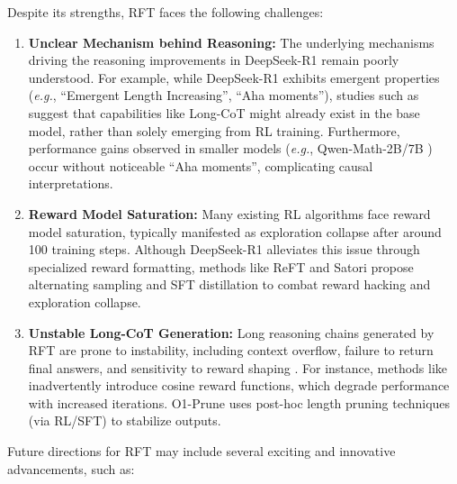 Despite its strengths, RFT faces the following challenges:

\begin{enumerate}[itemindent=0em]

\item \textbf{Unclear Mechanism behind Reasoning:} The underlying mechanisms driving the reasoning improvements in DeepSeek-R1 remain poorly understood. 
For example, while DeepSeek-R1 exhibits emergent properties (\emph{e.g.}, ``Emergent Length Increasing'', ``Aha moments''), studies such as \cite{ThereMaybeNot} suggest that capabilities like Long-CoT might already exist in the base model, rather than solely emerging from RL training. 
Furthermore, performance gains observed in smaller models (\emph{e.g.}, Qwen-Math-2B/7B \cite{qwen2}) occur without noticeable ``Aha moments'', complicating causal interpretations.

\item \textbf{Reward Model Saturation:} Many existing RL algorithms face reward model saturation, typically manifested as exploration collapse after around 100 training steps. 
Although DeepSeek-R1 alleviates this issue through specialized reward formatting, methods like ReFT \cite{trung2024reft} and Satori \cite{Satori} propose alternating sampling and SFT distillation to combat reward hacking and exploration collapse.

\item \textbf{Unstable Long-CoT Generation:} Long reasoning chains generated by RFT are prone to instability, including context overflow, failure to return final answers, and sensitivity to reward shaping \cite{Tecent_2_plus_3}. 
For instance, methods like \cite{yeo2025demystifying} inadvertently introduce cosine reward functions, which degrade performance with increased iterations. 
O1-Prune \cite{o1_pruner} uses post-hoc length pruning techniques \cite{team2025kimi} (via RL/SFT) to stabilize outputs.

\end{enumerate}


Future directions for RFT may include several exciting and innovative advancements, such as:

